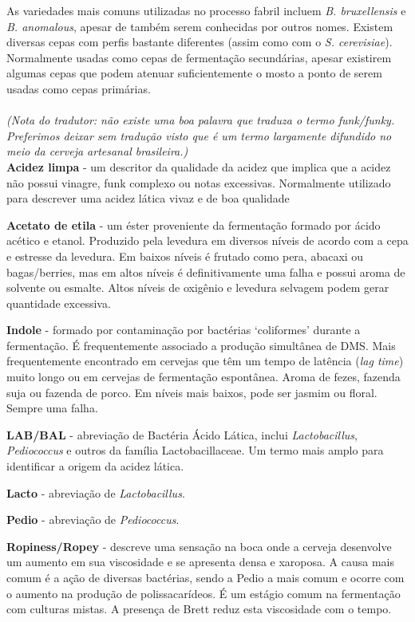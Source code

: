 As variedades mais comuns utilizadas no processo fabril incluem \textit{B. bruxellensis} e \textit{B. anomalous}, apesar de também serem conhecidas por outros nomes. Existem diversas cepas com perfis bastante diferentes (assim como com o \textit{S. cerevisiae}). Normalmente usadas como cepas de fermentação secundárias, apesar existirem algumas cepas que podem atenuar suficientemente o mosto a ponto de serem usadas como cepas primárias.\\\\
\textit{(Nota do tradutor: não existe uma boa palavra que traduza o termo funk/funky. Preferimos deixar sem tradução visto que é um termo largamente difundido no meio da cerveja artesanal brasileira.)}\\
\textbf{Acidez limpa} - um descritor da qualidade da acidez que implica que a acidez não possui vinagre, funk complexo ou notas excessivas. Normalmente utilizado para descrever uma acidez lática vivaz e de boa qualidade

\textbf{Acetato de etila} - um éster proveniente da fermentação formado por ácido acético e etanol. Produzido pela levedura em diversos níveis de acordo com a cepa e estresse da levedura. Em baixos níveis é frutado como pera, abacaxi ou bagas/berries, mas em altos níveis é definitivamente uma falha e possui aroma de solvente ou esmalte. Altos níveis de oxigênio e levedura selvagem podem gerar quantidade excessiva.

\textbf{Indole} - formado por contaminação por bactérias ‘coliformes’ durante a fermentação. É frequentemente associado a produção simultânea de DMS. Mais frequentemente encontrado em cervejas que têm um tempo de latência (\textit{lag time}) muito longo ou em cervejas de fermentação espontânea. Aroma de fezes, fazenda suja ou fazenda de porco. Em níveis mais baixos, pode ser jasmim ou floral. Sempre uma falha.

\textbf{LAB/BAL} - abreviação de Bactéria Ácido Lática, inclui \textit{Lactobacillus}, \textit{Pediococcus} e outros da família Lactobacillaceae. Um termo mais amplo para identificar a origem da acidez lática.

\textbf{Lacto} - abreviação de \textit{Lactobacillus}.

\textbf{Pedio} - abreviação de \textit{Pediococcus}.

\textbf{Ropiness/Ropey} - descreve uma sensação na boca onde a cerveja desenvolve um aumento em sua viscosidade e se apresenta densa e xaroposa. A causa mais comum é a ação de diversas bactérias, sendo a Pedio a mais comum e ocorre com o aumento na produção de polissacarídeos. É um estágio comum na fermentação com culturas mistas. A presença de Brett reduz esta viscosidade com o tempo.

